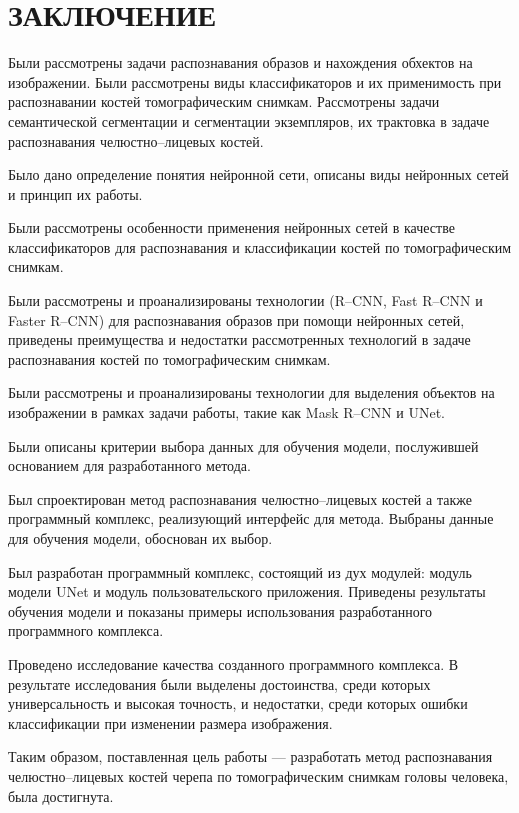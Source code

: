 \section*{ЗАКЛЮЧЕНИЕ}

Были рассмотрены задачи распознавания образов и нахождения обхектов на изображении. Были рассмотрены виды классификаторов и их применимость при распознавании костей томографическим снимкам. Рассмотрены задачи семантической сегментации и сегментации экземпляров, их трактовка в задаче распознавания челюстно--лицевых костей.

Было дано определение понятия нейронной сети, описаны виды нейронных сетей и принцип их работы.

Были рассмотрены особенности применения нейронных сетей в качестве классификаторов для распознавания и классификации костей по томографическим снимкам.

Были рассмотрены и проанализированы технологии (R--CNN, Fast R--CNN и Faster R--CNN) для распознавания образов при помощи нейронных сетей, приведены преимущества и недостатки рассмотренных технологий в задаче распознавания костей по томографическим снимкам.

Были рассмотрены и проанализированы технологии для выделения объектов на изображении в рамках задачи работы, такие как Mask R--CNN и UNet.

Были описаны критерии выбора данных для обучения модели, послужившей основанием для разработанного метода.

Был спроектирован метод распознавания челюстно--лицевых костей а также программный комплекс, реализующий интерфейс для метода. Выбраны данные для обучения модели, обоснован их выбор.

Был разработан программный комплекс, состоящий из дух модулей: модуль модели UNet и модуль пользовательского приложения. Приведены результаты обучения модели и показаны примеры использования разработанного программного комплекса.

Проведено исследование качества созданного программного комплекса. В результате исследования были выделены достоинства, среди которых универсальность и высокая точность, и недостатки, среди которых ошибки классификации при изменении размера изображения.

Таким образом, поставленная цель работы --- разработать метод распознавания челюстно--лицевых костей черепа по томографическим снимкам головы человека, была достигнута.